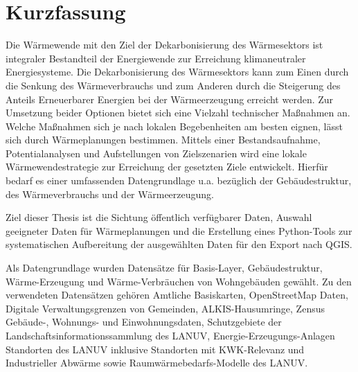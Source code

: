 

\begingroup 
	\section*{Kurzfassung}
	Die Wärmewende mit den Ziel der Dekarbonisierung des Wärmesektors ist integraler Bestandteil der Energiewende zur Erreichung klimaneutraler Energiesysteme. Die Dekarbonisierung des Wärmesektors kann zum Einen durch die Senkung des Wärmeverbrauchs und zum Anderen durch die Steigerung des Anteils Erneuerbarer Energien bei der Wärmeerzeugung erreicht werden. Zur Umsetzung beider Optionen bietet sich eine Vielzahl technischer Maßnahmen an. Welche Maßnahmen sich je nach lokalen Begebenheiten am besten eignen, lässt sich durch Wärmeplanungen bestimmen. Mittels einer Bestandsaufnahme, Potentialanalysen und Aufstellungen von Zielszenarien wird eine lokale Wärmewendestrategie zur Erreichung der gesetzten Ziele entwickelt. Hierfür bedarf es einer umfassenden Datengrundlage u.a. bezüglich der Gebäudestruktur, des Wärmeverbrauchs und der Wärmeerzeugung. 
	
	Ziel dieser Thesis ist die Sichtung öffentlich verfügbarer Daten, Auswahl geeigneter Daten für Wärmeplanungen und die Erstellung eines Python-Tools zur systematischen Aufbereitung der ausgewählten Daten für den Export nach QGIS. 
	
	Als Datengrundlage wurden Datensätze für Basis-Layer, Gebäudestruktur, Wärme-Erzeugung und Wärme-Verbräuchen von Wohngebäuden gewählt. Zu den verwendeten Datensätzen gehören Amtliche Basiskarten, OpenStreetMap Daten, Digitale Verwaltungsgrenzen von Gemeinden, ALKIS-Hausumringe, Zensus Gebäude-, Wohnungs- und Einwohnungsdaten, Schutzgebiete der Landschaftsinformationssammlung des LANUV, Energie-Erzeugungs-Anlagen Standorten des LANUV inklusive Standorten mit KWK-Relevanz und Industrieller Abwärme sowie Raumwärmebedarfs-Modelle des LANUV.

